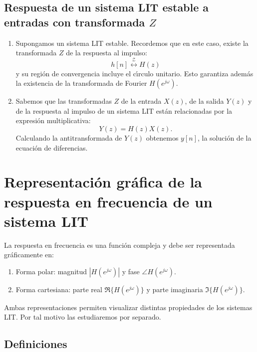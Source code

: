 \subsection{Respuesta de un sistema LIT estable a entradas con transformada $Z$}

\begin{enumerate}
	
	\item Supongamos un sistema LIT estable. Recordemos que en este caso, existe la transformada $Z$ de la respuesta al impulso:
	\begin{equation}
		h[n] \stackrel{\mathcal{Z}}{\longleftrightarrow} H(z)
	\end{equation}
	y su regi\'{o}n de convergencia incluye el c\'{\i}rculo unitario. Esto garantiza adem\'{a}s la existencia de la transformada de Fourier $H(e^{j\omega})$.
	
	\item Sabemos que las transformadas $Z$ de la entrada $X(z)$, de la salida $Y(z)$ y de la respuesta al impulso de un sistema LIT est\'{a}n relacionadas por la expresi\'{o}n multiplicativa:
	\begin{equation}
		Y(z) = H(z) X(z).
	\end{equation}
	Calculando la antitransformada de $Y(z)$ obtenemos $y[n]$, la soluci\'{o}n de la ecuaci\'{o}n de diferencias.
	
\end{enumerate}

\section{Representaci\'{o}n gr\'{a}fica de la respuesta en frecuencia de un sistema LIT}

La respuesta en frecuencia es una funci\'{o}n compleja y debe ser representada gr\'{a}ficamente en:
\begin{enumerate}
	\item Forma polar: magnitud $|H(e^{j\omega})|$ y fase $\angle H(e^{j\omega})$.
	\item Forma cartesiana: parte real $\Re\{H(e^{j\omega})\}$ y parte imaginaria $\Im\{H(e^{j\omega})\}$.
\end{enumerate}

Ambas representaciones permiten visualizar distintas propiedades de los sistemas LIT. Por tal motivo las estudiaremos por separado.

\subsection{Definiciones}


